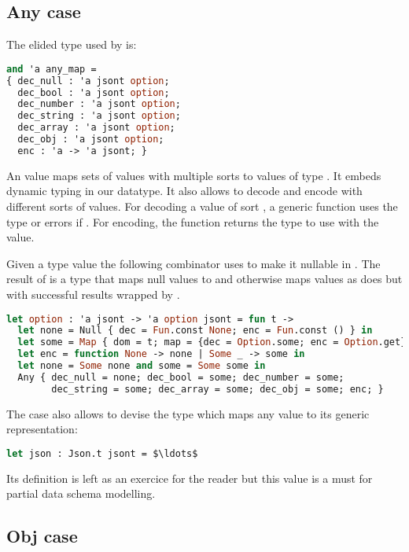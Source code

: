 \documentclass[nolinenum]{jfp}
\begin{document}
\subsection{Any case}
\label{sec:any_case}

The elided type  used by  is:
%
\begin{lstlisting}[language=ocaml]
and 'a any_map =
{ dec_null : 'a jsont option;
  dec_bool : 'a jsont option;
  dec_number : 'a jsont option;
  dec_string : 'a jsont option;
  dec_array : 'a jsont option;
  dec_obj : 'a jsont option;
  enc : 'a -> 'a jsont; }
\end{lstlisting}
%
An  value maps sets of \json{} values with multiple sorts
to values of type . It embeds dynamic typing in our
datatype. It also allows to decode and encode with different sorts
of \json{} values. For decoding a \json{} value of sort ,
a generic function uses the \json{} type  or errors if
. For encoding, the  function returns the
\json{} type to use with the value.

Given a \json{} type value  the following 
combinator uses  to make it nullable in \json{}. The result
of  is a \json{} type that maps \json{} null values to
 and otherwise maps \json{} values as  does but
with successful results wrapped by .
%
\begin{lstlisting}[language=ocaml]
let option : 'a jsont -> 'a option jsont = fun t ->
  let none = Null { dec = Fun.const None; enc = Fun.const () } in
  let some = Map { dom = t; map = {dec = Option.some; enc = Option.get}}in
  let enc = function None -> none | Some _ -> some in
  let none = Some none and some = Some some in
  Any { dec_null = none; dec_bool = some; dec_number = some;
        dec_string = some; dec_array = some; dec_obj = some; enc; }
\end{lstlisting}

The  case also allows to devise the \json{} type 
which maps any \json{} value to its generic representation:
%
\begin{lstlisting}[language=ocaml]
let json : Json.t jsont = $\ldots$
\end{lstlisting}
%
Its definition is left as an exercice for the reader but
this value is a must for partial data schema modelling.

\subsection{Obj case}
\label{sec:obj_case}
\end{document}
